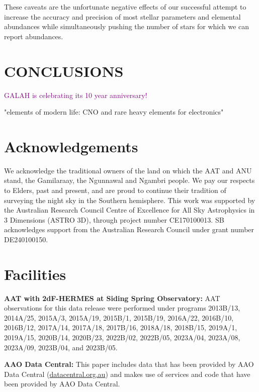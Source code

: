 \documentclass[
  journal=pasa,
  manuscript=research-paper, %
  year=2024,
  volume=37
]{cup-journal}
\newcommand{\SB}[1]{{\textcolor{purple}{#1}}}
\begin{document}
These caveats are the unfortunate negative effects of our successful attempt to increase the accuracy and precision of most stellar parameters and elemental abundances while simultaneously pushing the number of stars for which we can report abundances.

\section{CONCLUSIONS}
\label{sec:conclusion}

\SB{GALAH is celebrating its 10 year anniversary!}

"elements of modern life: CNO and rare heavy elements for electronics"


\section*{Acknowledgements}

We acknowledge the traditional owners of the land on which the AAT and ANU stand, the Gamilaraay, the Ngunnawal and Ngambri people. We pay our respects to Elders, past and present, and are proud to continue their tradition of surveying the night sky in the Southern hemisphere.
This work was supported by the Australian Research Council Centre of Excellence for All Sky Astrophysics in 3 Dimensions (ASTRO 3D), through project number CE170100013. SB acknowledges support from the Australian Research Council under grant number DE240100150.

\section*{Facilities}

\textbf{AAT with 2dF-HERMES at Siding Spring Observatory:}
AAT observations for this data release were performed under programs {2013B/13}, {2014A/25}, {2015A/3}, {2015A/19}, {2015B/1}, {2015B/19}, {2016A/22}, {2016B/10}, {2016B/12}, {2017A/14}, {2017A/18}, {2017B/16}, {2018A/18}, {2018B/15}, {2019A/1}, {2019A/15}, {2020B/14}, {2020B/23}, {2022B/02}, {2022B/05}, {2023A/04}, {2023A/08}, {2023A/09}, {2023B/04}, and {2023B/05}.

\textbf{AAO Data Central:} This paper includes data that has been provided by AAO Data Central  (\url{datacentral.org.au}) and makes use of services and code that have been provided by AAO Data Central.
\end{document}
